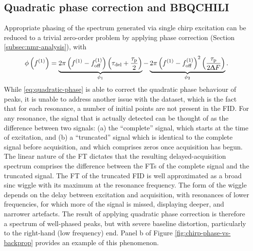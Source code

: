 \subsection{Quadratic phase correction and \acs{BBQCHILI}}
Appropriate phasing of the spectrum generated via single chirp excitation can
be reduced to a trivial zero-order problem by applying phase correction
(Section \ref{subsec:nmr-analysis}), with 
\begin{equation}
    \phi \left( f^{(1)} \right) =
        \underbrace{
            2 \pi \left(f^{(1)} - f_{\mathrm{off}}^{(1)}\right) \left(\tau_{\text{del}}
            + \frac{\tau_{\text{p}}}{2} \right)
        }_{\phi_1} -
        \underbrace{
            2 \pi \left(f^{(1)} - f_{\mathrm{off}}^{(1)}\right)^2 \left(
            \frac{\tau_{\text{p}}}{2 \Updelta F} \right)
        }_{\phi_2}.
    \label{eq:quadratic-phase}
\end{equation}
While \eqref{eq:quadratic-phase} is able to correct the quadratic phase
behaviour of peaks, it is unable to address another issue with the dataset,
which is the fact that for each resonance, a number of initial points are not
present in the \ac{FID}.
For any resonance, the signal that is actually detected can be thought of as
the difference between two signals: (a) the ``complete'' signal, which starts
at the time of excitation, and (b) a ``truncated'' signal which is identical to
the complete signal before acquisition, and which comprises zeros once
acquisition has begun. The linear nature of the \ac{FT} dictates that the
resulting delayed-acquisition spectrum comprises the difference between the
\acp{FT} of the complete signal and the truncated signal.  The \ac{FT} of the
truncated \ac{FID} is well approximated as a broad sinc wiggle with its maximum
at the resonance frequency. The form of the wiggle depends on the delay between
excitation and acquisition, with resonances of lower frequencies, for which
more of the signal is missed, displaying deeper, and narrower artefacts. The
result of applying quadratic phase correction is therefore a spectrum of
well-phased peaks, but with severe baseline distortion, particularly to the
right-hand (low frequency) end. Panel b of Figure
\ref{fig:chirp-phase-vs-backprop} provides an example of this phenomenon.

